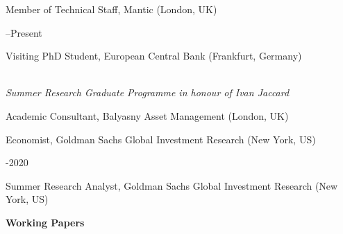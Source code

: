 \documentclass[letterpaper,10pt,oneside]{article}
\begin{document}



\normalsize
\noindent Member of Technical Staff, Mantic (London, UK) \hfill \begin{minipage}[t]{4cm}--Present
\end{minipage}

\vspace{2mm}

\noindent Visiting PhD Student, European Central Bank (Frankfurt, Germany) \hfill \begin{minipage}[t]{4cm}
\end{minipage} \\
\indent \textit{Summer Research Graduate Programme in honour of Ivan Jaccard}

\vspace{2mm}

\noindent Academic Consultant, Balyasny Asset Management (London, UK) \hfill \begin{minipage}[t]{4cm}
\end{minipage}

\vspace{2mm}

\noindent Economist, Goldman Sachs Global Investment Research (New York, US) \hfill \begin{minipage}[t]{3cm}-2020
\end{minipage}

\vspace{2mm}

\noindent Summer Research Analyst, Goldman Sachs Global Investment Research (New York, US) \hfill \begin{minipage}[t]{4cm}
\end{minipage}

\vspace{3mm}

\noindent \large \textbf{Working Papers}

\vspace{3mm} \normalsize
\end{document}
